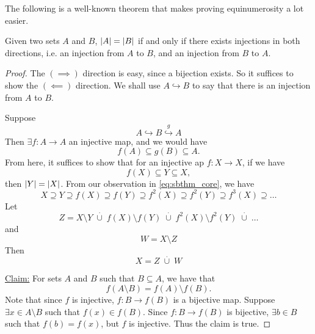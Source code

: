 \documentclass[notoc,notitlepage]{tufte-book}
\newcommand{\discup}{\; \overset{\cdot}{\cup} \;}
\newcommand{\injection}[1]{\overset{#1}{\hookrightarrow}}
\begin{document}
The following is a well-known theorem that makes proving equinumerosity a lot easier.

\begin{lemma}
\label{lemma:schroder_bernstein_theorem}
  Given two sets $A$ and $B$, $\left|A\right| = \left|B\right|$ if and only if there exists injections in both directions, i.e. an injection from $A$ to $B$, and an injection from $B$ to $A$.
\end{lemma}

\begin{proof}
  The $(\implies)$ direction is easy, since a bijection exists. So it suffices to show the $(\impliedby)$ direction. We shall use $A \hookrightarrow B$ to say that there is an injection from $A$ to $B$.

  Suppose
  \begin{equation*}
    A \injection{} B \injection{g} A
  \end{equation*}
  Then $\exists f : A \to A$ an injective map, and we would have
  \begin{equation}\label{eq:sbthm_core}
    f(A) \subseteq g(B) \subseteq A.
  \end{equation}
  From here, it suffices to show that for an injective ap $f : X \to X$, if we have
  \begin{equation*}
    f(X) \subseteq Y \subseteq X,
  \end{equation*}
  then $\left|Y\right| = \left|X\right|$. From our observation in \cref{eq:sbthm_core}, we have
  \begin{equation*}
    X \supseteq Y \supseteq f(X) \supseteq f(Y) \supseteq f^2(X) \supseteq f^2(Y) \supseteq f^3(X) \supseteq \hdots
  \end{equation*}
  Let
  \begin{equation*}
    Z = X \setminus Y \discup f(X) \setminus f(Y) \discup f^2(X) \setminus f^2(Y) \discup \hdots
  \end{equation*}
  and
  \begin{equation*}
    W = X \setminus Z
  \end{equation*}
  Then
  \begin{equation*}
    X = Z \discup W
  \end{equation*}

  \noindent\underline{Claim:} For sets $A$ and $B$ such that $B \subseteq A$, we have that
  \begin{equation*}
    f(A \setminus B) = f(A) \setminus f(B).
  \end{equation*}
  Note that since $f$ is injective, $f : B \to f(B)$ is a bijective map. Suppose $\exists x \in A \setminus B$ such that $f(x) \in f(B)$. Since $f : B \to f(B)$ is bijective, $\exists b \in B$ such that $f(b) = f(x)$, but $f$ is injective. Thus the claim is true.


\end{proof}
\end{document}
